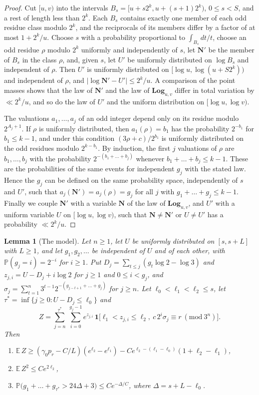\documentclass[12pt]{amsart}
\newtheorem{lemma}{Lemma}
\theoremstyle{definition}
\theoremstyle{remark}
\begin{document}
\begin{proof}
Cut $[u,v)$ into the intervals $B_s=[u+s2^k,u+(s+1)2^k)$, $0\le s<S$, and a rest of length less than $2^k$. Each $B_s$ contains exactly one member of each odd residue class modulo $2^k$, and the reciprocals of its members differ by a factor of at most $1+2^k/u$. Choose $s$ with a probability proportional to $\int_{B_s}dt/t$, choose an odd residue $\rho$ modulo $2^k$ uniformly and independently of $s$, let $\mathbf N'$ be the member of $B_s$ in the class $\rho$, and, given $s$, let $U'$ be uniformly distributed on $\log B_s$ and independent of $\rho$. Then $U'$ is uniformly distributed on $[\log u,\log(u+S2^k))$ and independent of $\rho$, and $|\log\mathbf N'-U'|\le2^k/u$. A comparison of the point masses shows that the law of $\mathbf N'$ and the law of $\mathbf{Log}_{u,v}$ differ in total variation by $\ll2^k/u$, and so do the law of $U'$ and the uniform distribution on $[\log u,\log v)$.

The valuations $a_1,\ldots,a_j$ of an odd integer depend only on its residue modulo $2^{A_j+1}$. If $\rho$ is uniformly distributed, then $a_1(\rho)=b_1$ has the probability $2^{-b_1}$ for $b_1\le k-1$, and under this condition $(3\rho+c)/2^{b_1}$ is uniformly distributed on the odd residues modulo $2^{k-b_1}$. By induction, the first $j$ valuations of $\rho$ are $b_1,\ldots,b_j$ with the probability $2^{-(b_1+\dots+b_j)}$ whenever $b_1+\dots+b_j\le k-1$. These are the probabilities of the same events for independent $g_j$ with the stated law. Hence the $g_j$ can be defined on the same probability space, independently of $s$ and $U'$, such that $a_j(\mathbf N')=a_j(\rho)=g_j$ for all $j$ with $g_1+\dots+g_j\le k-1$. Finally we couple $\mathbf N'$ with a variable $\mathbf N$ of the law of $\mathbf{Log}_{u,v}$, and $U'$ with a uniform variable $U$ on $[\log u,\log v)$, such that $\mathbf N\ne\mathbf N'$ or $U\ne U'$ has a probability $\ll2^k/u$.
\end{proof}

\begin{lemma}[The model]
\label{lem:model}
Let $n\ge1$, let $U$ be uniformly distributed on $[s,s+L]$ with $L\ge1$, and let $g_1,g_2,\ldots$ be independent of $U$ and of each other, with $\mathbb P(g_j=i)=2^{-i}$ for $i\ge1$. Put $D_j=\sum_{t\le j}(g_t\log2-\log3)$ and $z_{j,i}=U-D_j+i\log2$ for $j\ge1$ and $0\le i<g_j$, and $\sigma_j=\sum_{t=1}^{n}3^{t-1}2^{-(g_{j-t+1}+\dots+g_j)}$ for $j\ge n$. Let $\ell_0<\ell_1<\ell_2\le s$, let $\tau^*=\inf\{j\ge0:U-D_j\le\ell_0\}$ and
\[
Z=\sum_{j=n}^{\tau^*}\ \sum_{i=0}^{g_j-1}e^{z_{j,i}}\,\mathbf 1\bigl[\ell_1<z_{j,i}\le\ell_2,\ c\,2^i\sigma_j\equiv r\ (\mathrm{mod}\ 3^n)\bigr].
\]
Then
\begin{enumerate}[label=(\alph*)]
	\item $\mathbb E\,Z\ge(\gamma_0p_r-C/L)(e^{\ell_2}-e^{\ell_1})-Ce^{\ell_2-(\ell_1-\ell_0)}(1+\ell_2-\ell_1)$,
	\item $\mathbb E\,Z^2\le Ce^{2\ell_2}$,
	\item $\mathbb P\bigl(g_1+\dots+g_{\tau^*}>24\Delta+3\bigr)\le Ce^{-\Delta/C}$, where $\Delta=s+L-\ell_0$.
\end{enumerate}
\end{lemma}
\end{document}
